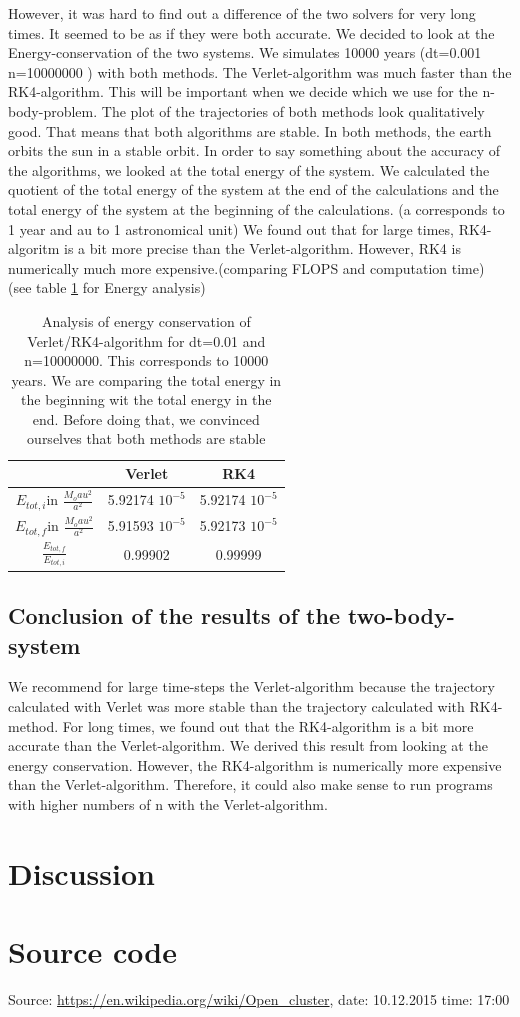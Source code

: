 \documentclass[10pt,a4paper]{article}
\begin{document}
However, it was hard to find out a difference of the two solvers for very long times. It seemed to be as if they were both accurate. We decided to look at the Energy-conservation of the two systems. We simulates 10000 years (dt=0.001 n=10000000 ) with both methods. The Verlet-algorithm was much faster than the RK4-algorithm. This will be important when we decide which we use for the n-body-problem. 
The plot of the trajectories of both methods look qualitatively good. That means that both algorithms are stable. In both methods, the earth orbits the sun in a stable orbit. 
In order to say something about the accuracy of the algorithms, we looked at the total energy of the system. We calculated the quotient of the total energy of the system at the end of the calculations and the total energy of the system at the beginning of the calculations. (a corresponds to 1 year and au to 1 astronomical unit) We found out that for large times, RK4-algoritm is a bit more precise than the Verlet-algorithm. However, RK4 is numerically much more expensive.(comparing FLOPS and computation time) (see table \ref{TWOB_Energy_analysis} for Energy analysis) 
\begin{table}[h]
\centering
\caption{Analysis of energy conservation of Verlet/RK4-algorithm for dt=0.01 and n=10000000. This corresponds to 10000 years. We are comparing the total energy in the beginning wit the total energy in the end. Before doing that, we convinced ourselves that both methods are stable \label{TWOB_Energy_analysis}}
\begin{tabular}{c|c|c}
&Verlet & RK4 \\
\hline \hline
$E_{tot,i}$in $\frac{M_o au^2}{a^2}$ &5.92174 $10^{-5}$ &5.92174 $10^{-5}$ \\
$E_{tot,f}$in $\frac{M_o au^2}{a^2}$ &5.91593 $10^{-5}$ &5.92173 $10^{-5}$ \\
\hline
$\frac{E_{tot,f}}{E_{tot,i}}$ & 0.99902& 0.99999\\
\end{tabular}
\end{table}

\subsection{Conclusion of the results of the two-body-system}

We recommend for large time-steps the Verlet-algorithm because the trajectory calculated with Verlet was more stable than the trajectory calculated with RK4-method. 
For long times, we found out that the RK4-algorithm is a bit more accurate than the Verlet-algorithm. We derived this result from looking at the energy conservation. However, the RK4-algorithm is numerically more expensive than the Verlet-algorithm. Therefore, it could also make sense to run programs with higher numbers of n with the Verlet-algorithm.

\section{Discussion}

\section{Source code}

\begin{thebibliography}{mustermarke}
 Source: \url{https://en.wikipedia.org/wiki/Open_cluster}, date: 10.12.2015 time: 17:00
\end{thebibliography}
\end{document}
